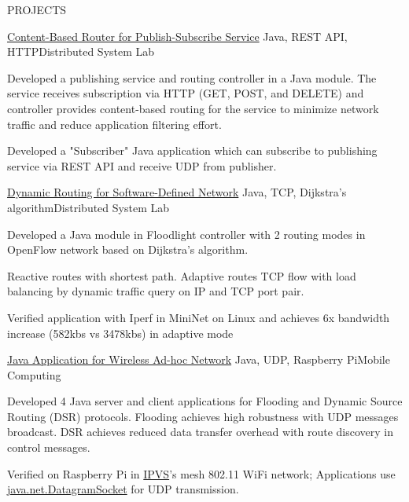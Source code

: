 \documentclass{resume} %
\begin{document}
\begin{rSection}{PROJECTS}
\begin{rSubsection}{\href{https://github.com/kuangyu0801/software-defined-networking-ws20/tree/main/sdn-assign-04}{Content-Based Router for Publish-Subscribe Service}} { Java, REST API, HTTP}{Distributed System Lab}{}
\item Developed a publishing service and routing controller in a Java module.  The service receives subscription via HTTP (GET, POST, and
DELETE) and controller provides content-based routing for the service to minimize network traffic and reduce application filtering effort.
\item Developed a "Subscriber" Java application which can subscribe to publishing service via REST API and receive UDP  from publisher.

\end{rSubsection}

\begin{rSubsection}{\href{https://github.com/kuangyu0801/software-defined-networking-ws20/tree/main/sdn-assign-03}{Dynamic Routing for Software-Defined Network}} {Java, TCP, Dijkstra's algorithm}{Distributed System Lab}{}
\item Developed a Java module in Floodlight controller with 2 routing modes in OpenFlow network based on Dijkstra's algorithm.
\item Reactive routes with shortest path. Adaptive routes TCP flow with load balancing by dynamic traffic query on IP and TCP port pair.
\item Verified application with Iperf in MiniNet on Linux and achieves 6x bandwidth increase (582kbs vs 3478kbs) in adaptive mode
\end{rSubsection}

\begin{rSubsection}{\href{https://github.com/kuangyu0801/MobileComputing_SS20_assign04}{Java Application for Wireless Ad-hoc Network}} {Java, UDP, Raspberry Pi}{Mobile Computing}{}
\item Developed 4 Java server and client applications for Flooding and Dynamic Source Routing (DSR) protocols. Flooding achieves high robustness with UDP messages broadcast. DSR achieves reduced data transfer overhead with route discovery in control messages. 
\item Verified on Raspberry Pi in \href {https://www.ipvs.uni-stuttgart.de/}{IPVS}'s mesh 802.11 WiFi network; Applications use \href {https://docs.oracle.com/javase/7/docs/api/java/net/DatagramSocket.html}{java.net.DatagramSocket} for UDP transmission.


\end{rSubsection}
\end{rSection}
\end{document}
